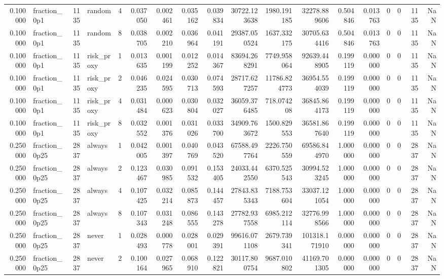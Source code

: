 \begin{tabular}{rlrlrrrrrrrrrrrrrr}
0.100000 & fraction\_0p1 & 1135 & random & 4 & 0.037050 & 0.002461 & 0.035162 & 0.039834 & 30722.123638 & 1980.191185 & 32278.889606 & 0.504846 & 0.013763 & 0 & 0 & 1135 & NaN \\
0.100000 & fraction\_0p1 & 1135 & random & 8 & 0.038705 & 0.002210 & 0.036964 & 0.041191 & 29387.050524 & 1637.332175 & 30705.634416 & 0.504846 & 0.013763 & 0 & 0 & 1135 & NaN \\
0.100000 & fraction\_0p1 & 1135 & risk\_proxy & 1 & 0.013635 & 0.001199 & 0.012252 & 0.014367 & 83694.268291 & 7749.958064 & 92639.448905 & 0.199119 & 0.000000 & 0 & 0 & 1135 & NaN \\
0.100000 & fraction\_0p1 & 1135 & risk\_proxy & 2 & 0.046235 & 0.024595 & 0.030713 & 0.074593 & 28717.627257 & 11786.824773 & 36954.554039 & 0.199119 & 0.000000 & 0 & 0 & 1135 & NaN \\
0.100000 & fraction\_0p1 & 1135 & risk\_proxy & 4 & 0.031484 & 0.000623 & 0.030804 & 0.032027 & 36059.376485 & 718.074208 & 36845.864173 & 0.199119 & 0.000000 & 0 & 0 & 1135 & NaN \\
0.100000 & fraction\_0p1 & 1135 & risk\_proxy & 8 & 0.032552 & 0.001376 & 0.031026 & 0.033700 & 34909.763672 & 1500.829553 & 36581.867640 & 0.199119 & 0.000000 & 0 & 0 & 1135 & NaN \\
0.250000 & fraction\_0p25 & 2837 & always & 1 & 0.042005 & 0.001397 & 0.040769 & 0.043520 & 67588.497764 & 2226.750559 & 69586.844970 & 1.000000 & 0.000000 & 0 & 0 & 2837 & NaN \\
0.250000 & fraction\_0p25 & 2837 & always & 2 & 0.123467 & 0.030985 & 0.091532 & 0.153405 & 24033.442550 & 6370.525543 & 30994.523245 & 1.000000 & 0.000000 & 0 & 0 & 2837 & NaN \\
0.250000 & fraction\_0p25 & 2837 & always & 4 & 0.107425 & 0.032214 & 0.085873 & 0.144457 & 27843.835343 & 7188.753604 & 33037.121054 & 1.000000 & 0.000000 & 0 & 0 & 2837 & NaN \\
0.250000 & fraction\_0p25 & 2837 & always & 8 & 0.107343 & 0.031248 & 0.086555 & 0.143278 & 27782.937558 & 6985.212114 & 32776.998566 & 1.000000 & 0.000000 & 0 & 0 & 2837 & NaN \\
0.250000 & fraction\_0p25 & 2837 & never & 1 & 0.028493 & 0.000778 & 0.028001 & 0.029391 & 99616.071108 & 2679.739341 & 101318.171910 & 0.000000 & 0.000000 & 0 & 0 & 2837 & NaN \\
0.250000 & fraction\_0p25 & 2837 & never & 2 & 0.100164 & 0.027965 & 0.068910 & 0.122821 & 30117.800754 & 9687.010802 & 41169.701305 & 0.000000 & 0.000000 & 0 & 0 & 2837 & NaN \\

\end{tabular}
